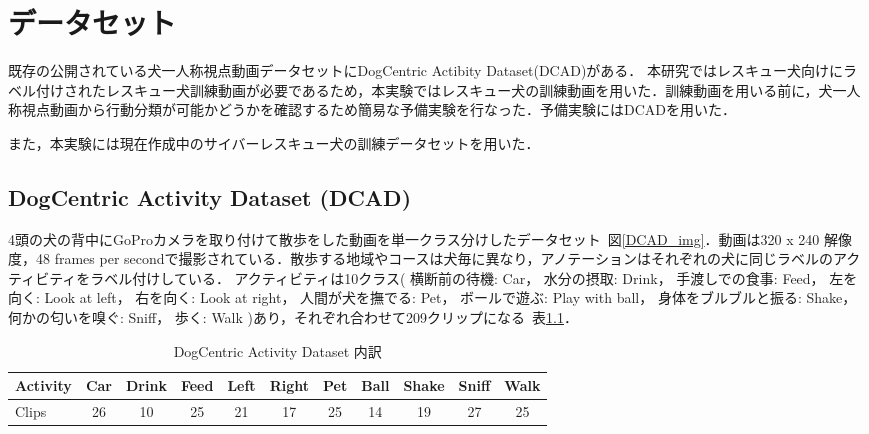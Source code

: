 
\chapter{データセット}
既存の公開されている犬一人称視点動画データセットにDogCentric Actibity Dataset(DCAD)がある．
本研究ではレスキュー犬向けにラベル付けされたレスキュー犬訓練動画が必要であるため，本実験ではレスキュー犬の訓練動画を用いた．訓練動画を用いる前に，犬一人称視点動画から行動分類が可能かどうかを確認するため簡易な予備実験を行なった．予備実験にはDCADを用いた．

また，本実験には現在作成中のサイバーレスキュー犬の訓練データセットを用いた．

\section{DogCentric Activity Dataset (DCAD)}
4頭の犬の背中にGoProカメラを取り付けて散歩をした動画を単一クラス分けしたデータセット~図\ref{DCAD_img}．動画は320 x 240 解像度，48 frames per secondで撮影されている．散歩する地域やコースは犬毎に異なり，アノテーションはそれぞれの犬に同じラベルのアクティビティをラベル付けしている．
アクティビティは10クラス(
横断前の待機: Car， 水分の摂取: Drink， 手渡しでの食事: Feed， 左を向く: Look at left， 右を向く: Look at right， 人間が犬を撫でる: Pet， ボールで遊ぶ: Play with ball， 身体をブルブルと振る: Shake， 何かの匂いを嗅ぐ: Sniff， 歩く: Walk
)あり，それぞれ合わせて209クリップになる~表\ref{DCADlabel}．
\begin{table}[tb]
 \centering
 \caption{DogCentric Activity Dataset 内訳}\label{DCADlabel}
  \begin{tabular}{|l||c|c|c|c|c|c|c|c|c|c|}
   \hline \hline
   Activity& Car &Drink& Feed& Left&Right& Pet & Ball&Shake&Sniff&Walk \\ \hline
   Clips   &   26&   10&   25&   21&   17&   25&   14&   19&   27&   25\\ \hline
  \end{tabular}

\end{table}

